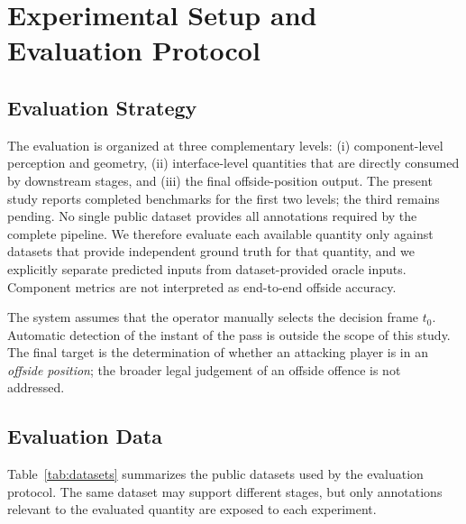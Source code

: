 \documentclass[runningheads]{llncs}
\begin{document}
\section{Experimental Setup and Evaluation Protocol}
\label{sec:experiments}

\subsection{Evaluation Strategy}
\label{subsec:eval_strategy}
The evaluation is organized at three complementary levels: (i) component-level perception and geometry, (ii) interface-level quantities that are directly consumed by downstream stages, and (iii) the final offside-position output. The present study reports completed benchmarks for the first two levels; the third remains pending. No single public dataset provides all annotations required by the complete pipeline. We therefore evaluate each available quantity only against datasets that provide independent ground truth for that quantity, and we explicitly separate predicted inputs from dataset-provided oracle inputs. Component metrics are not interpreted as end-to-end offside accuracy.

The system assumes that the operator manually selects the decision frame $t_0$. Automatic detection of the instant of the pass is outside the scope of this study. The final target is the determination of whether an attacking player is in an \emph{offside position}; the broader legal judgement of an offside offence is not addressed.

\subsection{Evaluation Data}
\label{subsec:datasets}
Table~\ref{tab:datasets} summarizes the public datasets used by the evaluation protocol. The same dataset may support different stages, but only annotations relevant to the evaluated quantity are exposed to each experiment.
\end{document}
